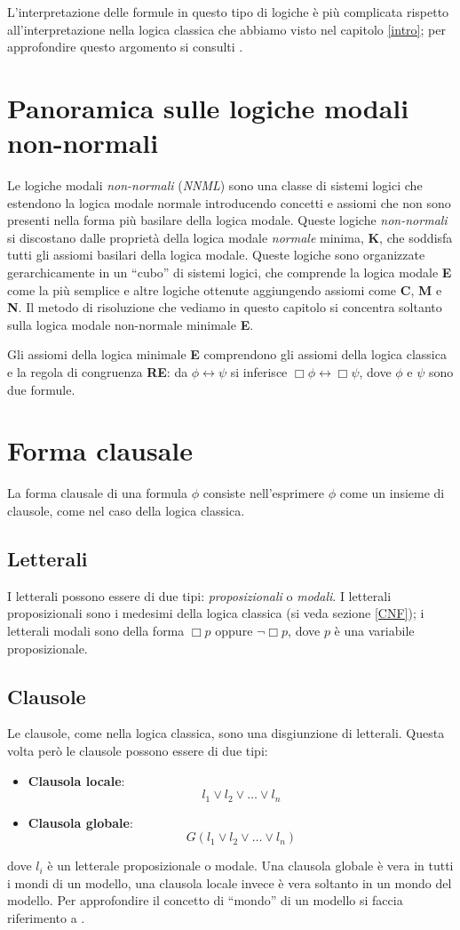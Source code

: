 \documentclass[a4paper,12pt]{report}
\newcommand{\tto} {\leftrightarrow}
\begin{document}
L'interpretazione delle formule in questo tipo di logiche è più complicata rispetto all'interpretazione nella logica classica che abbiamo visto nel capitolo \ref{intro}; per approfondire questo argomento si consulti \cite{Articolo_resolution}.

\section{Panoramica sulle logiche modali non-normali}
Le logiche modali \emph{non-normali} (\emph{NNML}) sono una classe di sistemi logici che estendono la logica modale normale introducendo concetti e assiomi che non sono presenti nella forma più basilare della logica modale. Queste logiche \emph{non-normali} si discostano dalle proprietà della logica modale \emph{normale} minima, \textbf{K}, che soddisfa tutti gli assiomi basilari della logica modale. Queste logiche sono organizzate gerarchicamente in un ``cubo'' di sistemi logici, che comprende la logica modale \textbf{E} come la più semplice e altre logiche ottenute aggiungendo assiomi come \textbf{C}, \textbf{M} e \textbf{N}. Il metodo di risoluzione che vediamo in questo capitolo si concentra soltanto sulla logica modale non-normale minimale \textbf{E}.

Gli assiomi della logica minimale \textbf{E} comprendono gli assiomi della logica classica e la regola di congruenza \textbf{RE}: da $\phi \tto \psi$ si inferisce $\Box \phi \tto \Box \psi$, dove $\phi$ e $\psi$ sono due formule.

\section{Forma clausale}
La forma clausale di una formula $\phi$ consiste nell'esprimere $\phi$ come un insieme di clausole, come nel caso della logica classica.
\subsection*{Letterali}
I letterali possono essere di due tipi: \emph{proposizionali} o \emph{modali}. I letterali proposizionali sono i medesimi della logica classica (si veda sezione \ref{CNF}); i letterali modali sono della forma $\Box p$ oppure $\lnot \Box p$, dove $p$ è una variabile proposizionale.
\subsection*{Clausole}
Le clausole, come nella logica classica, sono una disgiunzione di letterali. Questa volta però le clausole possono essere di due tipi: 
\begin{itemize}
    \item \textbf{Clausola locale}: \[ l_1 \lor l_2 \lor \ldots \lor l_n \]
    \item \textbf{Clausola globale}: \[ G(l_1 \lor l_2 \lor \ldots \lor l_n) \]
\end{itemize}
dove $l_i$ è un letterale proposizionale o modale. Una clausola globale è vera in tutti i mondi di un modello, una clausola locale invece è vera soltanto in un mondo del modello. Per approfondire il concetto di ``mondo'' di un modello si faccia riferimento a \cite{Articolo_resolution}.
\end{document}
